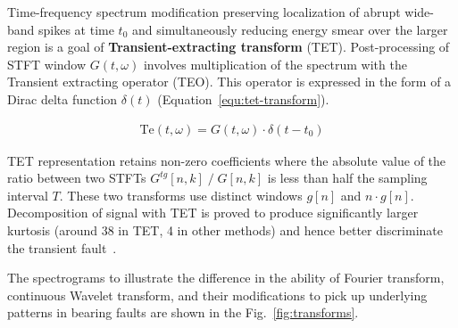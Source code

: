 Time-frequency spectrum modification preserving localization of abrupt wide-band spikes at time $t_0$ and simultaneously reducing energy smear over the larger region is a goal of \textbf{Transient-extracting transform} (TET). Post-processing of STFT window $G(t,\omega)$ involves multiplication of the spectrum with the Transient extracting operator (TEO). This operator is expressed in the form of a Dirac delta function $\delta(t)$ (Equation~\ref{equ:tet-transform}).

\begin{ceqn}\begin{align}
\mathrm{Te}(t,\omega) = G(t,\omega) \cdot  \delta(t - t_0)
\label{equ:tet-transform}
\end{align}\end{ceqn}

TET representation retains non-zero coefficients where the absolute value of the ratio between two STFTs $G^{tg}[n, k]\;/\;G[n, k]$ is less than half the sampling interval $T$. These two transforms use distinct windows $g[n]$ and $n \cdot g[n]$. Decomposition of signal with TET is proved to produce significantly larger kurtosis (around 38 in TET, 4 in other methods) and hence better discriminate the transient fault~\cite{yu_concentrated_2020}.

The spectrograms to illustrate the difference in the ability of Fourier transform, continuous Wavelet transform, and their modifications to pick up underlying patterns in bearing faults are shown in the Fig.~\ref{fig:transforms}.

